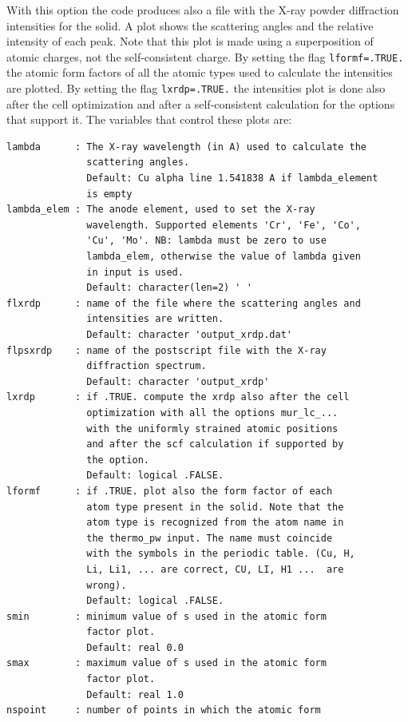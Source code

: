 \documentclass[12pt,a4paper,twoside]{report}
\begin{document}
With this option the code produces also a file with the X-ray
powder diffraction intensities for the solid. A plot shows the 
scattering angles and the relative intensity of each peak. Note 
that this plot is made using 
a superposition of atomic charges, not the self-consistent charge.
By setting the flag \texttt{lformf=.TRUE.} the atomic form factors of all 
the atomic types used to calculate the intensities are plotted. 
By setting the flag \texttt{lxrdp=.TRUE.} the intensities plot is done also 
after the cell optimization and after a self-consistent calculation 
for the options that support it.
The variables that control these plots are:

\begin{verbatim}
lambda      : The X-ray wavelength (in A) used to calculate the 
              scattering angles.
              Default: Cu alpha line 1.541838 A if lambda_element 
              is empty
lambda_elem : The anode element, used to set the X-ray 
              wavelength. Supported elements 'Cr', 'Fe', 'Co', 
              'Cu', 'Mo'. NB: lambda must be zero to use 
              lambda_elem, otherwise the value of lambda given 
              in input is used.
              Default: character(len=2) ' ' 
flxrdp      : name of the file where the scattering angles and 
              intensities are written.
              Default: character 'output_xrdp.dat'
flpsxrdp    : name of the postscript file with the X-ray 
              diffraction spectrum.
              Default: character 'output_xrdp'
lxrdp       : if .TRUE. compute the xrdp also after the cell 
              optimization with all the options mur_lc_... 
              with the uniformly strained atomic positions 
              and after the scf calculation if supported by 
              the option. 
              Default: logical .FALSE.
lformf      : if .TRUE. plot also the form factor of each 
              atom type present in the solid. Note that the 
              atom type is recognized from the atom name in 
              the thermo_pw input. The name must coincide 
              with the symbols in the periodic table. (Cu, H, 
              Li, Li1, ... are correct, CU, LI, H1 ...  are 
              wrong).
              Default: logical .FALSE.
smin        : minimum value of s used in the atomic form 
              factor plot.
              Default: real 0.0
smax        : maximum value of s used in the atomic form 
              factor plot.
              Default: real 1.0
nspoint     : number of points in which the atomic form 

\end{verbatim}
\end{document}
